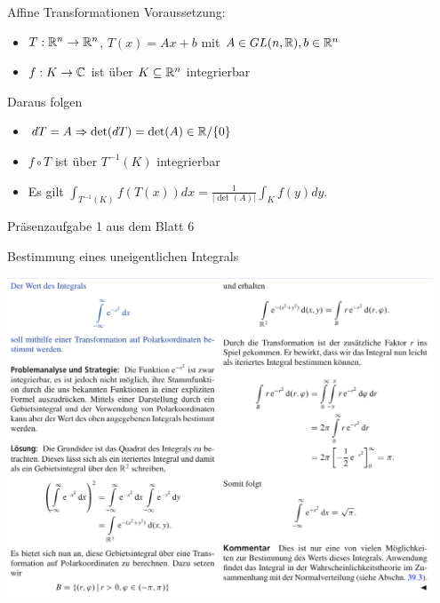 \begin{Def}{Affine Transformationen}
    Voraussetzung:
    \begin{itemize}
        \item $T:\mathbb{R}^n\rightarrow \mathbb{R}^n$, $T(x)=Ax+b$ mit $A\in GL(n,\mathbb{R}), b\in \mathbb{R}^n$
        \item $f:K\rightarrow \mathbb{C}$ ist über $K\subseteq \mathbb{R}^n$ integrierbar
    \end{itemize}
    Daraus folgen
    \begin{itemize}
        \item $dT=A \Rightarrow \det(dT)=\det(A)\in \mathbb{R}/\{0\}$
        \item $f\circ T$ ist über $T^{-1}(K)$ integrierbar
        \item Es gilt $\int_{T^{-1}(K)} f(T(x)) dx = \frac{1}{|\det(A)|}\int_K f(y) dy$.
    \end{itemize}
\end{Def}
\begin{Beispiel}{Präsenzaufgabe 1 aus dem Blatt 6}
\end{Beispiel}
\begin{Beispiel}{Bestimmung eines uneigentlichen Integrals}
    \begin{center}
    \includegraphics[width=0.95\textwidth]{Dateien/Uneigentlich_e_hoch_x_quadrat.png}

\end{center}
\end{Beispiel}
